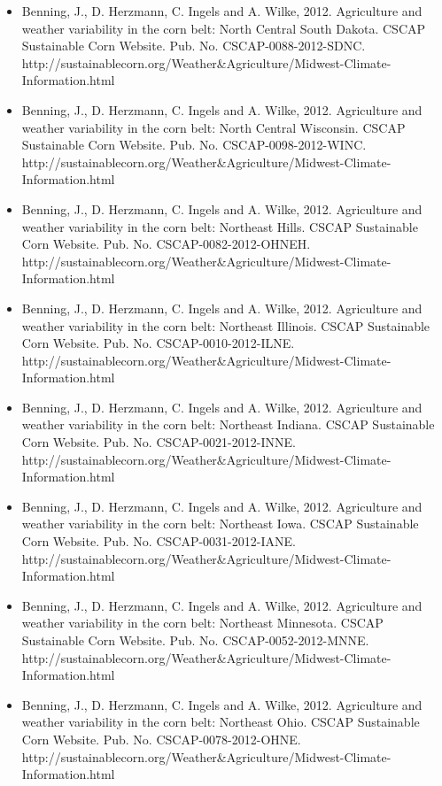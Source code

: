 \begin{itemize}
\item Benning, J., D. Herzmann, C. Ingels and A. Wilke, 2012. Agriculture and weather variability in the corn belt: North Central South Dakota. CSCAP Sustainable Corn Website. Pub. No. CSCAP-0088-2012-SDNC. http://sustainablecorn.org/Weather\&Agriculture/Midwest-Climate-Information.html

\item Benning, J., D. Herzmann, C. Ingels and A. Wilke, 2012. Agriculture and weather variability in the corn belt: North Central Wisconsin. CSCAP Sustainable Corn Website. Pub. No. CSCAP-0098-2012-WINC. http://sustainablecorn.org/Weather\&Agriculture/Midwest-Climate-Information.html

\item Benning, J., D. Herzmann, C. Ingels and A. Wilke, 2012. Agriculture and weather variability in the corn belt: Northeast Hills. CSCAP Sustainable Corn Website. Pub. No. CSCAP-0082-2012-OHNEH. http://sustainablecorn.org/Weather\&Agriculture/Midwest-Climate-Information.html

\item Benning, J., D. Herzmann, C. Ingels and A. Wilke, 2012. Agriculture and weather variability in the corn belt: Northeast Illinois. CSCAP Sustainable Corn Website. Pub. No. CSCAP-0010-2012-ILNE. http://sustainablecorn.org/Weather\&Agriculture/Midwest-Climate-Information.html

\item Benning, J., D. Herzmann, C. Ingels and A. Wilke, 2012. Agriculture and weather variability in the corn belt: Northeast Indiana. CSCAP Sustainable Corn Website. Pub. No. CSCAP-0021-2012-INNE. http://sustainablecorn.org/Weather\&Agriculture/Midwest-Climate-Information.html

\item Benning, J., D. Herzmann, C. Ingels and A. Wilke, 2012. Agriculture and weather variability in the corn belt: Northeast Iowa. CSCAP Sustainable Corn Website. Pub. No. CSCAP-0031-2012-IANE. http://sustainablecorn.org/Weather\&Agriculture/Midwest-Climate-Information.html

\item Benning, J., D. Herzmann, C. Ingels and A. Wilke, 2012. Agriculture and weather variability in the corn belt: Northeast Minnesota. CSCAP Sustainable Corn Website. Pub. No. CSCAP-0052-2012-MNNE. http://sustainablecorn.org/Weather\&Agriculture/Midwest-Climate-Information.html

\item Benning, J., D. Herzmann, C. Ingels and A. Wilke, 2012. Agriculture and weather variability in the corn belt: Northeast Ohio. CSCAP Sustainable Corn Website. Pub. No. CSCAP-0078-2012-OHNE. http://sustainablecorn.org/Weather\&Agriculture/Midwest-Climate-Information.html


\end{itemize}
